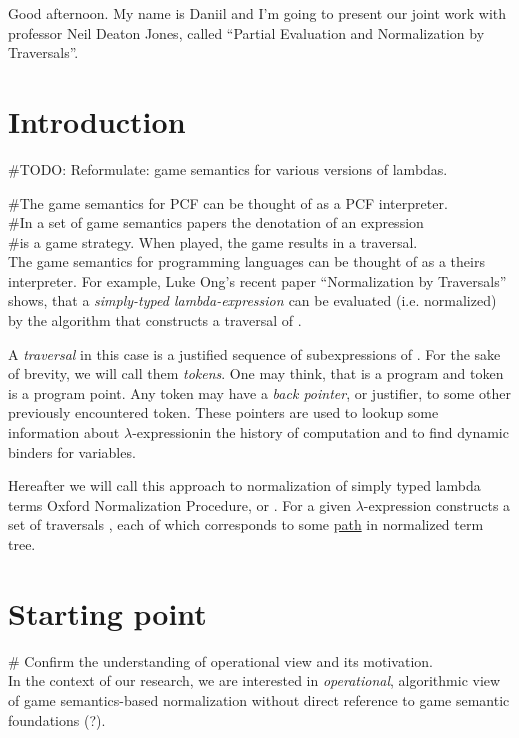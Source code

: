 \documentclass[a4paper, 10pt]{article}
\newcommand{\red}[1]{{\color{red}#1}}
\newcommand{\green}[1]{{\color{blue!20!black!30!green}#1}}
\newcommand{\blue}[1]{{\color{blue}#1}}
\newcommand{\lam}[1]{{\color{brown}\emph{\boldmath{#1}}}}
\newcommand{\lexp}{$\lambda$-expression}
\begin{document}
Good afternoon. My name is Daniil and I'm going to present our joint work with 
professor Neil Deaton Jones, called ``Partial Evaluation and Normalization by 
Traversals''. 


\section{Introduction}

\#TODO:
Reformulate: game semantics for various versions of lambdas.

\#The game semantics for PCF can be thought of as a PCF interpreter.\\
\#In a set of game semantics papers the denotation of an expression\\
\#is a game strategy. When played, the game results in a traversal.\\

The game semantics for programming languages can be thought of as a theirs 
interpreter. For example, Luke Ong’s recent paper ``Normalization by 
Traversals'' shows, that a \blue{\emph{simply-typed lambda-expression 
\lam{M}}} can be \red{evaluated} (i.e. normalized) by the algorithm that
constructs a \green{traversal} of \lam{M}.

A \green{\emph{traversal}} in this case is a justified sequence
of subexpressions of \lam{$M$}. For the sake of brevity, we will call them
\green{\emph{tokens}}. One may think, that \lam{$M$} is 
a \blue{program} and token is a \blue{program point}. Any token
may have a \green{\emph{back pointer}}, or justifier, to some other 
previously encountered token. These pointers are used to lookup some 
information about \lexp in the history of computation and to find
dynamic binders for variables.

Hereafter we will call this approach to normalization of simply typed
lambda terms \green{Oxford Normalization Procedure}, or \lam{ONP}.
For a given \lexp \lam{$M$} \lam{ONP} constructs a set of traversals
\lam{$\mathfrak{Trav}(M)$}, each of which corresponds to some
\underline{path} in normalized term tree.


\section{Starting point}

\# Confirm the understanding of operational view and its motivation.\\
In the context of our research, we are interested in \emph{operational}, 
algorithmic view of game semantics-based normalization without direct
reference to game semantic foundations (?).
\end{document}
